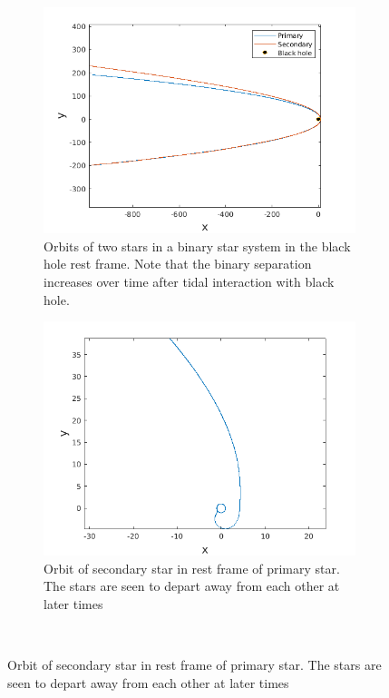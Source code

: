 \documentclass[a4paper]{article}
\begin{document}
\begin{enumerate} [label*=\textbf{(\alph*)}]
					\begin{figure} [h]
						\begin{subfigure} {.5\columnwidth}
							\includegraphics[width=\columnwidth]{../plots/3d_orbitsdisruption_equalaxes.png}
							\caption{Orbits of two stars in a binary star system in the black hole rest frame. Note that the binary separation increases over time after tidal interaction with black hole.}
							\label{fig:3da}
						\end{subfigure}
						\hfill
						\begin{subfigure} {.5\columnwidth}
							\includegraphics[width=\columnwidth]{../plots/3d_secondaryorbitdisruption_equalaxes.png}
							\caption{Orbit of secondary star in rest frame of primary star. The stars are seen to depart away from each other at later times}
							\label{fig:3db}
						\end{subfigure}\\
						

\end{figure}
\end{enumerate}
\end{document}
